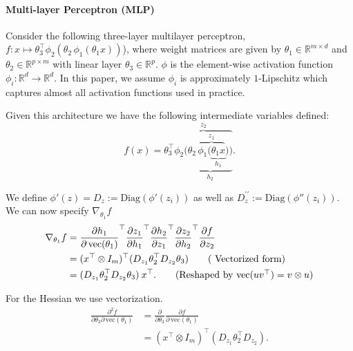 \documentclass{article}
\theoremstyle{plain}
\theoremstyle{definition}
\theoremstyle{remark}
\begin{document}
\paragraph{Multi-layer Perceptron (MLP)}
Consider the following three-layer multilayer perceptron, \( f: x \mapsto \theta_3^{\top} \phi_2 (\theta_2\,  \phi_1(\theta_1 x))\)), where weight matrices are given by $\theta_1 \in \mathbb{R}^{m \times d}$ and $\theta_2 \in \mathbb{R}^{p \times m}$ with linear layer $\theta_3 \in \mathbb{R}^{p}$. $\phi$ is the element-wise activation function $\phi_i: \mathbb{R}^d \to \mathbb{R}^d$. In this paper, we assume $\phi_i$ is approximately $1$-Lipschitz which captures almost all activation functions used in practice.

Given this architecture we have the following intermediate variables defined:
\begin{equation}
\label{eq:mlp-annotated}
f(x) = \theta_3^{\top} \overbrace{
\phi_2 (
\underbrace{\theta_2\,  \overbrace{\phi_1(\underbrace{\theta_1 x}_{h_1}}^{z_1}))}_{h_2}
}^\text{$z_2$}.
\end{equation}

We define $\phi'(z) = D_z := \mathrm{Diag}(\phi'(z_i))$ as well as $D_z^{\prime\prime} := \mathrm{Diag}(\phi''(z_i))$. We can now specify $\nabla_{\theta_1} f$
\begin{align*}
\nabla_{\theta_1} f &= \frac{\partial  h_1}{\partial \,\mathrm{vec}(\theta_1)}^{\top} \frac{\partial  z_1}{\partial h_1}^{\top} \frac{\partial  h_2}{\partial z_1}^{\top}  \frac{\partial  z_2}{\partial h_2}^{\top}  \frac{\partial  f}{\partial z_2} \\
&=  (x^{\top} \otimes I_{m})^{\top} (D_{z_1} \theta_2^{\top}    D_{z_2} \theta_3) \tag{ Vectorized form} \\
&=  (D_{z_1} \theta_2^{\top}    D_{z_2} \theta_3) \: x^{\top}. \tag{Reshaped by $\text{vec}(uv^{\top})= v \otimes u$}
\end{align*}

For the Hessian we use vectorization.
\begin{align*}
\frac{\partial^2 f}{\partial \theta_3 \partial \,\mathrm{vec}(\theta_1)} &= \frac{\partial}{\partial \theta_3}  \frac{\partial f}{\partial \,\mathrm{vec}{(\theta_1)}}  \\ &= (x^{\top} \otimes I_{m})^{\top} (D_{z_1} \theta_2^{\top}    D_{z_2}). \tag{Numerator Layour}
\end{align*}
\end{document}
